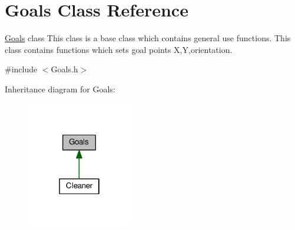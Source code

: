 \hypertarget{classGoals}{}\section{Goals Class Reference}
\label{classGoals}


\hyperlink{classGoals}{Goals} class This class is a base class which contains general use functions. This class contains functions which sets goal point\textquotesingle{}s X,Y,orientation.  




{\ttfamily \#include $<$Goals.\+h$>$}



Inheritance diagram for Goals\+:\nopagebreak
\begin{figure}[H]
\begin{center}
\leavevmode
\includegraphics[width=130pt]{classGoals__inherit__graph}
\end{center}
\end{figure}
